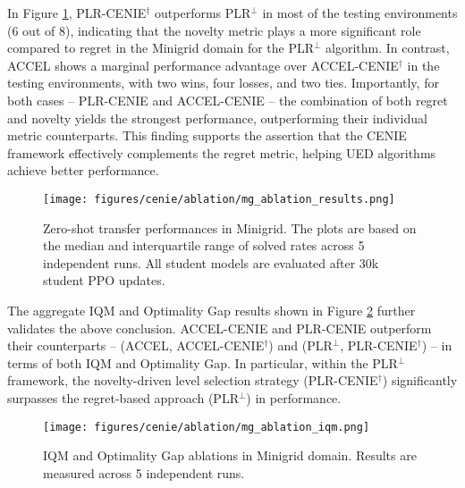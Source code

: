 In Figure \ref{fig:mg_ablation_results}, PLR-CENIE$^\dag$ outperforms PLR$^\perp$ in most of the testing environments (6 out of 8), indicating that the novelty metric plays a more significant role compared to regret in the Minigrid domain for the PLR$^\perp$ algorithm. In contrast, ACCEL shows a marginal performance advantage over ACCEL-CENIE$^\dag$ in the testing environments, with two wins, four losses, and two ties. Importantly, for both cases -- PLR-CENIE and ACCEL-CENIE -- the combination of both regret and novelty yields the strongest performance, outperforming their individual metric counterparts. This finding supports the assertion that the CENIE framework effectively complements the regret metric, helping UED algorithms achieve better performance.

\begin{figure}[h]
  \centering
  \texttt{[image: figures/cenie/ablation/mg\_ablation\_results.png]}
  \caption{Zero-shot transfer performances in Minigrid. The plots are based on the median and interquartile range of solved rates across 5 independent runs. All student models are evaluated after 30k student PPO updates.}
  \label{fig:mg_ablation_results}
\end{figure}

The aggregate IQM and Optimality Gap results shown in Figure \ref{fig:mg_ablation_iqm} further validates the above conclusion. ACCEL-CENIE and PLR-CENIE outperform their counterparts -- (ACCEL, ACCEL-CENIE$^\dag$) and (PLR$^\perp$, PLR-CENIE$^\dag$) -- in terms of both IQM and Optimality Gap. In particular, within the PLR$^\perp$ framework, the novelty-driven level selection strategy (PLR-CENIE$^\dag$) significantly surpasses the regret-based approach (PLR$^\perp$) in performance.
\begin{figure}[H]
  \centering
  \texttt{[image: figures/cenie/ablation/mg\_ablation\_iqm.png]}
  \caption{IQM and Optimality Gap ablations in Minigrid domain. Results are measured across 5 independent runs.}
  \label{fig:mg_ablation_iqm}
\end{figure}

